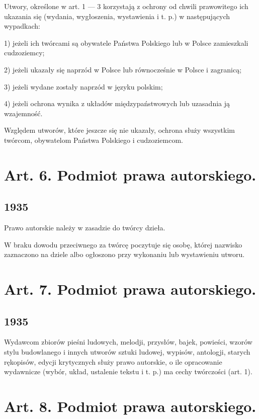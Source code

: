 \documentclass[withmarginpar]{book}
\begin{document}
Utwory, określone w art. 1 — 3 korzystają z ochrony od chwili
prawowitego ich ukazania się (wydania, wygłoszenia, wystawienia i
t. p.) w następujących wypadkach:

1) jeżeli ich twórcami są obywatele Państwa Polskiego lub w Polsce zamieszkali cudzoziemcy;

2) jeżeli ukazały się naprzód w Polsce lub równocześnie w Polsce i zagranicą;

3) jeżeli wydane zostały naprzód w języku polskim;

4) jeżeli ochrona wynika z układów międzypaństwowych lub uzasadnia ją wzajemność.

Względem utworów, które jeszcze się nie ukazały, ochrona służy wszystkim twórcom, obywatelom Państwa Polskiego i cudzoziemcom.

\section{Art.  6. Podmiot prawa autorskiego.}
\label{sec:art.-6}

\subsection{1935}
\label{sec:art.-6-1}

Prawo autorskie należy w zasadzie do twórcy dzieła.

W braku dowodu przeciwnego za twórcę poczytuje się osobę, której
nazwisko zaznaczono na dziele albo ogłoszono przy wykonaniu lub
wystawieniu utworu.

\section{Art.  7. Podmiot prawa autorskiego.}
\label{sec:art.-7}

\subsection{1935}
\label{sec:art.-7-1}

Wydawcom zbiorów pieśni ludowych, melodji, przysłów, bajek, powieści,
wzorów stylu budowlanego i innych utworów sztuki ludowej, wypisów,
antologji, starych rękopisów, edycji krytycznych służy prawo
autorskie, o ile opracowanie wydawnicze (wybór, układ, ustalenie
tekstu i t. p.) ma cechy twórczości (art. 1).

\section{Art.  8. Podmiot prawa autorskiego.}
\label{sec:art.-8}
\end{document}
